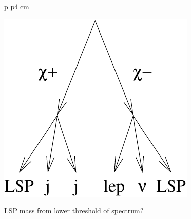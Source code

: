 \documentclass[landscape]{article}
\begin{document}
\begin{center}
\begin{tabular}{p{\textheight} p{4 cm}}
\begin{minipage}{\linewidth}
      \includegraphics[width=\linewidth]{charginos_signal.pdf}

      \vspace{1 cm}
      LSP mass from lower threshold of spectrum?
    \end{minipage}
  \end{tabular}
\end{center}
\end{document}
